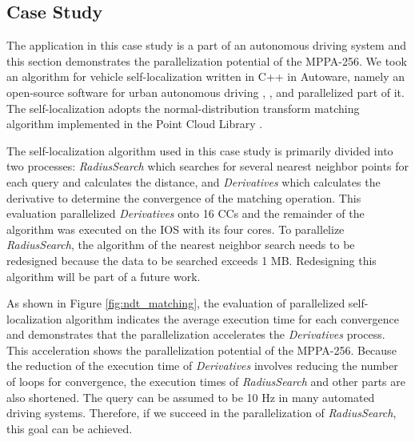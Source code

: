 \documentclass[conference,compsoc]{IEEEtran}
\begin{document}
\subsection{Case Study}
\label{sec:case_study}
The application in this case study is a part of an autonomous driving system and this section demonstrates the parallelization potential of the MPPA-256.
We took an algorithm for vehicle self-localization written in C++ in Autoware, namely an open-source software for urban autonomous driving \cite{autoware}, \cite{kato2015open}, and parallelized part of it.
The self-localization adopts the normal-distribution transform matching algorithm \cite{magnusson2009three} implemented in the Point Cloud Library \cite{pcl}.

The self-localization algorithm used in this case study is primarily divided into two processes: \emph{RadiusSearch} which searches for several nearest neighbor points for each query and calculates the distance, and \emph{Derivatives} which calculates the derivative to determine the convergence of the matching operation.
This evaluation parallelized \emph{Derivatives} onto 16 CCs and the remainder of the algorithm was executed on the IOS with its four cores.
To parallelize \emph{RadiusSearch}, the algorithm of the nearest neighbor search needs to be redesigned because the data to be searched exceeds 1 MB.
Redesigning this algorithm will be part of a future work.

As shown in Figure \ref{fig:ndt_matching}, the evaluation of parallelized self-localization algorithm indicates the average execution time for each convergence and demonstrates that the parallelization accelerates the \emph{Derivatives} process.
This acceleration shows the parallelization potential of the MPPA-256.
Because the reduction of the execution time of \emph{Derivatives} involves reducing the number of loops for convergence, the execution times of \emph{RadiusSearch} and other parts are also shortened.
The query can be assumed to be 10 Hz in many automated driving systems.
Therefore, if we succeed in the parallelization of \emph{RadiusSearch}, this goal can be achieved.
\end{document}
